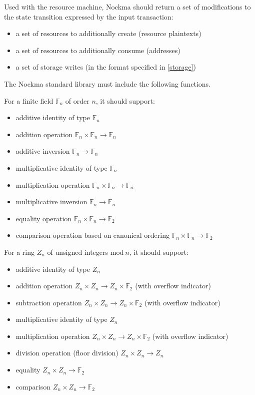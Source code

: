 \documentclass[
    11pt,            %
    techreport,        %
    affiltop,       %
]{art}
\begin{document}
Used with the resource machine, Nockma should return a set of modifications to the state transition expressed by the input transaction:

\begin{itemize}
    \item a set of resources to additionally create (resource plaintexts)
    \item a set of resources to additionally consume (addresses)
    \item a set of storage writes (in the format specified in \ref{storage})
\end{itemize}

The Nockma standard library must include the following functions.

For a finite field $\mathbb{F}_n$ of order $n$, it should support:
\begin{itemize}
    \item additive identity of type $\mathbb{F}_n$
    \item addition operation $\mathbb{F}_n \times \mathbb{F}_n \rightarrow \mathbb{F}_n$
    \item additive inversion $\mathbb{F}_n \rightarrow \mathbb{F}_n$
    \item multiplicative identity of type $\mathbb{F}_n$
    \item multiplication operation $\mathbb{F}_n \times \mathbb{F}_n \rightarrow \mathbb{F}_n$
    \item multiplicative inversion $\mathbb{F}_n \rightarrow \mathbb{F}_n$
    \item equality operation $\mathbb{F}_n \times \mathbb{F}_n \rightarrow \mathbb{F}_2$
    \item comparison operation based on canonical ordering $\mathbb{F}_n \times \mathbb{F}_n \rightarrow \mathbb{F}_2$
\end{itemize}

For a ring $Z_n$ of unsigned integers $\mathrm{mod}~n$, it should support:
\begin{itemize}
    \item additive identity of type $Z_n$
    \item addition operation $Z_n \times Z_n \rightarrow Z_n \times \mathbb{F}_2$ (with overflow indicator)
    \item subtraction operation $Z_n \times Z_n \rightarrow Z_n \times \mathbb{F}_2$ (with overflow indicator)
    \item multiplicative identity of type $Z_n$
    \item multiplication operation $Z_n \times Z_n \rightarrow Z_n \times \mathbb{F}_2$ (with overflow indicator)
    \item division operation (floor division) $Z_n \times Z_n \rightarrow Z_n$
    \item equality $Z_n \times Z_n \rightarrow \mathbb{F}_2$
    \item comparison $Z_n \times Z_n \rightarrow \mathbb{F}_2$
\end{itemize}
\end{document}
